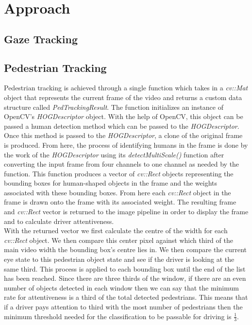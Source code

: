 \section{Approach}

\subsection{Gaze Tracking}


\subsection{Pedestrian Tracking}
Pedestrian tracking is achieved through a single function which takes in a \emph{cv::Mat} object that represents the current frame of the video and returns a custom data structure called \emph{PedTrackingResult}. The function initializes an instance of OpenCV's \emph{HOGDescriptor} object. With the help of OpenCV, this object can be passed a human detection method which can be passed to the \emph{HOGDescriptor}. Once this method is passed to the \emph{HOGDescriptor}, a clone of the original frame is produced. From here, the process of identifying humans in the frame is done by the work of the \emph{HOGDescriptor} using its \emph{detectMultiScale()} function after converting the input frame from four channels to one channel as needed by the function. This function produces a vector of \emph{cv::Rect} objects representing the bounding boxes for human-shaped objects in the frame and the weights associated with these bounding boxes. From here each \emph{cv::Rect} object in the frame is drawn onto the frame with its associated weight. The resulting frame and \emph{cv::Rect} vector is returned to the image pipeline in order to display the frame and to calculate driver attentiveness.\\

With the returned vector we first calculate the centre of the width for each \emph{cv::Rect} object. We then compare this center pixel against which third of the main video width the bounding box's centre lies in. We then compare the current eye state to this pedestrian object state and see if the driver is looking at the same third. This process is applied to each bounding box until the end of the list has been reached. Since there are three thirds of the window, if there are an even number of objects detected in each window then we can say that the minimum rate for attentiveness is a third of the total detected pedestrians. This means that if a driver pays attention to third with the most number of pedestrians then the minimum threshold needed for the classification to be passable for driving is $\frac{1}{3}$.

